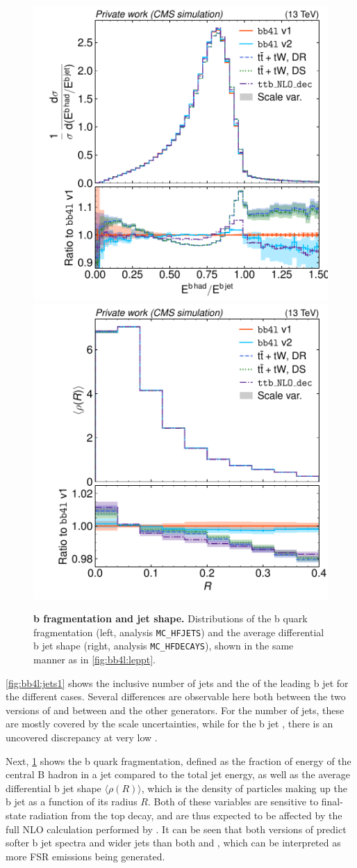 \begin{figure}[tp]
    \centering
    \includegraphics[width=0.49 \textwidth]{figures/bb4l/generators/MC_HFJETS_efracB.pdf}
    \hfill
    \includegraphics[width=0.49 \textwidth]{figures/bb4l/generators/MC_HFDECAYS_avg_rho_B_jet.pdf}
    \caption{\textbf{b fragmentation and jet shape.} Distributions of the b quark fragmentation (left, \rivet analysis \texttt{MC\_HFJETS}) and the average differential b jet shape (right, \rivet analysis \texttt{MC\_HFDECAYS}), shown in the same manner as in \cref{fig:bb4l:leppt}.}
    \label{fig:bb4l:jets2}
\end{figure}

\cref{fig:bb4l:jets1} shows the inclusive number of jets and the \pt of the leading b jet for the different cases. Several differences are observable here both between the two versions of \bbfourl and between \bbfourl and the other generators. For the number of jets, these are mostly covered by the scale uncertainties, while for the b jet \pt, there is an uncovered discrepancy at very low \pt.

Next, \cref{fig:bb4l:jets2} shows the b quark fragmentation, defined as the fraction of energy of the central B hadron in a jet compared to the total jet energy, as well as the average differential b jet shape $\langle \rho (R) \rangle$, which is the density of particles making up the b jet as a function of its radius $R$. Both of these variables are sensitive to final-state radiation from the top decay, and are thus expected to be affected by the full NLO calculation performed by \bbfourl. It can be seen that both versions of \bbfourl predict softer b jet spectra and wider jets than both \tttWsum and \ttb, which can be interpreted as more FSR emissions being generated.

